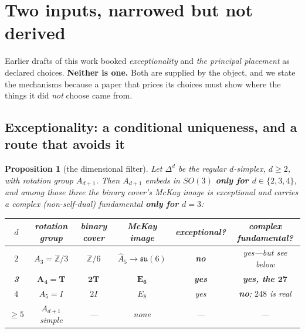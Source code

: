 \documentclass[11pt,reqno]{amsart}
\theoremstyle{plain}
\newtheorem{proposition}[theorem]{Proposition}
\theoremstyle{definition}
\theoremstyle{remark}
\newcommand{\Z}{\mathbb{Z}}
\newcommand{\su}{\mathfrak{su}}
\begin{document}
\section{Two inputs, narrowed but not derived}\label{sec:nomination}

Earlier drafts of this work booked \emph{exceptionality} and \emph{the principal
placement} as declared choices. \textbf{Neither is one.} Both are supplied by the object,
and we state the mechanisms because a paper that prices its choices must show where the
things it did \emph{not} choose came from.

\subsection{Exceptionality: a conditional uniqueness, and a route that avoids it}
\label{sec:excnom}

\begin{proposition}[the dimensional filter]\label{prop:dimfilter}
Let $\Delta^d$ be the regular $d$-simplex, $d\ge2$, with rotation group $A_{d+1}$. Then
$A_{d+1}$ embeds in $SO(3)$ \textbf{only for $d\in\{2,3,4\}$}, and among those three the
binary cover's McKay image is \emph{exceptional} and carries a complex (non-self-dual)
fundamental \textbf{only for $d=3$}:
\begin{center}\small
\begin{tabular}{@{}cccccc@{}}
\toprule
$d$ & rotation group & binary cover & McKay image & exceptional? & complex fundamental?\\
\midrule
$2$ & $A_3=\Z/3$ & $\Z/6$ & $\widehat{A}_5\to\su(6)$ & \textbf{no} & yes---but see below\\
\textbf{3} & $\mathbf{A_4=T}$ & $\mathbf{2T}$ & $\mathbf{E_6}$ & \textbf{yes} & \textbf{yes, the $\mathbf{27}$}\\
$4$ & $A_5=I$ & $2I$ & $E_8$ & yes & \textbf{no}; $248$ is real\\
$\ge5$ & $A_{d+1}$ simple & --- & none & --- & ---\\
\bottomrule
\end{tabular}
\end{center}
\end{proposition}
\end{document}
